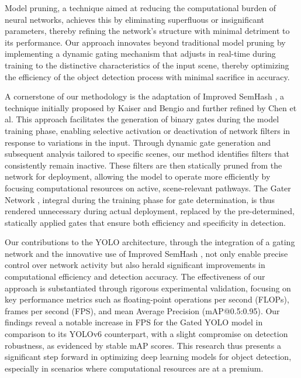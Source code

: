 Model pruning, a technique aimed at reducing the computational burden of neural networks, achieves this by eliminating superfluous or insignificant parameters, thereby refining the network's structure with minimal detriment to its performance. Our approach innovates beyond traditional model pruning by implementing a dynamic gating mechanism that adjusts in real-time during training to the distinctive characteristics of the input scene, thereby optimizing the efficiency of the object detection process with minimal sacrifice in accuracy.

A cornerstone of our methodology is the adaptation of Improved SemHash \cite*{kaiser2018discrete}, a technique initially proposed by Kaiser and Bengio and further refined by Chen et al. \cite*{chen2019you} This approach facilitates the generation of binary gates during the model training phase, enabling selective activation or deactivation of network filters in response to variations in the input. Through dynamic gate generation and subsequent analysis tailored to specific scenes, our method identifies filters that consistently remain inactive. These filters are then statically pruned from the network for deployment, allowing the model to operate more efficiently by focusing computational resources on active, scene-relevant pathways. The Gater Network \cite*{chen2019you}, integral during the training phase for gate determination, is thus rendered unnecessary during actual deployment, replaced by the pre-determined, statically applied gates that ensure both efficiency and specificity in detection.

Our contributions to the YOLO architecture, through the integration of a gating network and the innovative use of Improved SemHash \cite*{kaiser2018discrete}, not only enable precise control over network activity but also herald significant improvements in computational efficiency and detection accuracy. The effectiveness of our approach is substantiated through rigorous experimental validation, focusing on key performance metrics such as floating-point operations per second (FLOPs), frames per second (FPS), and mean Average Precision (mAP@0.5:0.95). Our findings reveal a notable increase in FPS for the Gated YOLO model in comparison to its YOLOv6 counterpart, with a slight compromise on detection robustness, as evidenced by stable mAP scores. This research thus presents a significant step forward in optimizing deep learning models for object detection, especially in scenarios where computational resources are at a premium.

